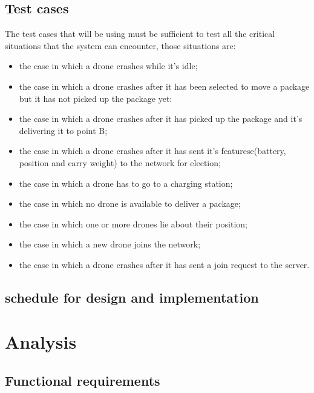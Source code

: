 \documentclass[a4paper, oneside]{memoir}
\begin{document}
\section{Test cases}
The test cases that will be using must be sufficient to test all the critical situations that the system can encounter, those situations are:
\begin{itemize}
\item the case in which a drone crashes while it's idle;
\item the case in which a drone crashes after it has been selected to move a package but it has not picked up the package yet:
\item the case in which a drone crashes after it has picked up the package and it's delivering it to point B;
\item the case in which a drone crashes after it has sent it's featurese(battery, position and carry weight) to the network for election;
\item the case in which a drone has to go to a charging station;
\item the case in which no drone is available to deliver a package;
\item the case in which one or more drones lie about their position;
\item the case in which a new drone joins the network;
\item the case in which a drone crashes after it has sent a join request to the server.
\end{itemize}


\section{schedule for design and implementation}


\chapter{Analysis}\label{ch:analysis}


\section{Functional requirements}

\end{document}
